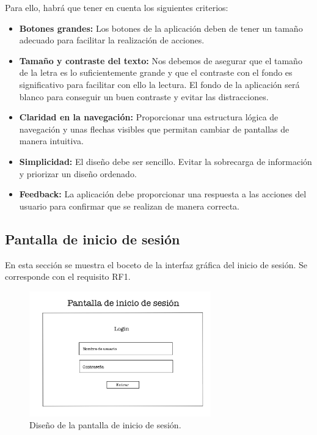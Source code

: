 Para ello, habrá que tener en cuenta los siguientes criterios:

\begin{itemize}
	\item \textbf{Botones grandes:} Los botones de la aplicación deben de tener un tamaño adecuado para facilitar la realización de acciones. 
	\item \textbf{Tamaño y contraste del texto:} Nos debemos de asegurar que el tamaño de la letra es lo suficientemente grande y que el contraste con el fondo es significativo para facilitar con ello la lectura. El fondo de la aplicación será blanco para conseguir un buen contraste y evitar las distracciones. 
	\item \textbf{Claridad en la navegación:} Proporcionar una estructura lógica de navegación y unas flechas visibles que permitan cambiar de pantallas de manera intuitiva. 
	\item \textbf{Simplicidad:} El diseño debe ser sencillo. Evitar la sobrecarga de información y priorizar un diseño ordenado. 
	\item \textbf{Feedback:} La aplicación debe proporcionar una respuesta a las acciones del usuario para confirmar que se realizan de manera correcta. 
\end{itemize} 

\newpage

\subsection{Pantalla de inicio de sesión}

En esta sección se muestra el boceto de la interfaz gráfica del inicio de sesión. Se corresponde con el requisito RF1. 

\begin{figure}[ht]
	\centering
	\includegraphics[width=0.7\textwidth, angle=270]{imagenes/inicio_sesion.JPG}
	\caption{Diseño de la pantalla de inicio de sesión.}
	\label{fig:iniciosesion}
\end{figure}

